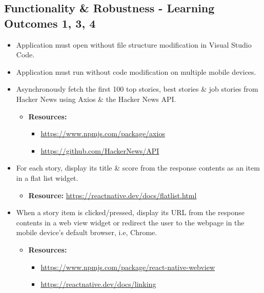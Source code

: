 \documentclass{article}
\begin{document}
\subsection*{Functionality \& Robustness - Learning Outcomes 1, 3, 4}
\begin{itemize}
    \item Application must open without file structure modification in Visual Studio Code.
    \item Application must run without code modification on multiple mobile devices.
    \item Asynchronously fetch the first 100 top stories, best stories \& job stories from Hacker News using Axios \& the Hacker News API.
    \begin{itemize}
        \item \textbf{Resources:}
        \begin{itemize}
            \item \footnotesize\href{https://www.npmjs.com/package/axios}{https://www.npmjs.com/package/axios}
            \item \footnotesize\href{https://github.com/HackerNews/API}{https://github.com/HackerNews/API}
        \end{itemize}
    \end{itemize}
    \item For each story, display its title \& score from the response contents as an item in a flat list widget.
    \begin{itemize}
        \item \textbf{Resource:} \footnotesize\href{https://reactnative.dev/docs/flatlist.html}{https://reactnative.dev/docs/flatlist.html}
    \end{itemize}
    \item When a story item is clicked/pressed, display its URL from the response contents in a web view widget or redirect the user to the webpage in the mobile device's default browser, i.e, Chrome.
    \begin{itemize}
        \item \textbf{Resources:} 
        \begin{itemize} 
            \item \footnotesize\href{https://www.npmjs.com/package/react-native-webview}{https://www.npmjs.com/package/react-native-webview}
            \item \footnotesize\href{https://reactnative.dev/docs/linking}{https://reactnative.dev/docs/linking}
        \end{itemize}

\end{itemize}
\end{itemize}
\end{document}
